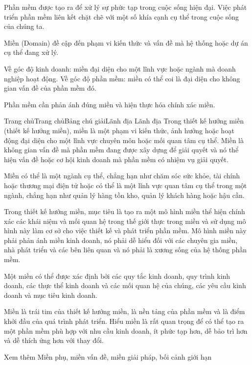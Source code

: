 Phần mềm được tạo ra để xử lý sự phức tạp trong cuộc sống hiện đại. Việc phát triển phần mềm liên kết chặt chẽ với một số khía cạnh cụ thể trong cuộc sống của chúng ta.

Miền (Domain) đề cập đến phạm vi kiến thức và vấn đề mà hệ thống hoặc dự án cụ thể đang xử lý.

Về góc độ kinh doanh: miền đại diện cho một lĩnh vực hoặc ngành mà doanh nghiệp hoạt động.
Về góc độ phần mềm: miền có thể coi là đại diện cho không gian vấn đề của phần mềm đó.

Phần mềm cần phản ánh đúng miền và hiện thực hóa chính xác miền.




Trang chủTrang chủBảng chú giảiLãnh địa
Lãnh địa
Trong thiết kế hướng miền (thiết kế hướng miền), miền là một phạm vi kiến thức, ảnh hưởng hoặc hoạt động đại diện cho một lĩnh vực chuyên môn hoặc mối quan tâm cụ thể. Miền là không gian vấn đề mà phần mềm đang được xây dựng để giải quyết và nó thể hiện vấn đề hoặc cơ hội kinh doanh mà phần mềm có nhiệm vụ giải quyết.

Miền có thể là một ngành cụ thể, chẳng hạn như chăm sóc sức khỏe, tài chính hoặc thương mại điện tử hoặc có thể là một lĩnh vực quan tâm cụ thể trong một ngành, chẳng hạn như quản lý hàng tồn kho, quản lý khách hàng hoặc hậu cần.

Trong thiết kế hướng miền, mục tiêu là tạo ra một mô hình miền thể hiện chính xác các khái niệm và mối quan hệ trong thế giới thực trong miền và sử dụng mô hình này làm cơ sở cho việc thiết kế và phát triển phần mềm. Mô hình miền này phải phản ánh miền kinh doanh, nó phải dễ hiểu đối với các chuyên gia miền, nhà phát triển và các bên liên quan và nó phải là xương sống của hệ thống phần mềm.

Một miền có thể được xác định bởi các quy tắc kinh doanh, quy trình kinh doanh, các thực thể kinh doanh và các mối quan hệ của chúng, các yêu cầu kinh doanh và mục tiêu kinh doanh.

Miền là trái tim của thiết kế hướng miền, là nền tảng của phần mềm và là điểm khởi đầu của quá trình phát triển. Hiểu miền là rất quan trọng để có thể tạo ra một phần mềm phù hợp với nhu cầu kinh doanh, ít phức tạp hơn, dễ bảo trì hơn và dễ thích ứng hơn với thay đổi.

Xem thêm	 Miền phụ, miền vấn đề, miền giải pháp, bối cảnh giới hạn

